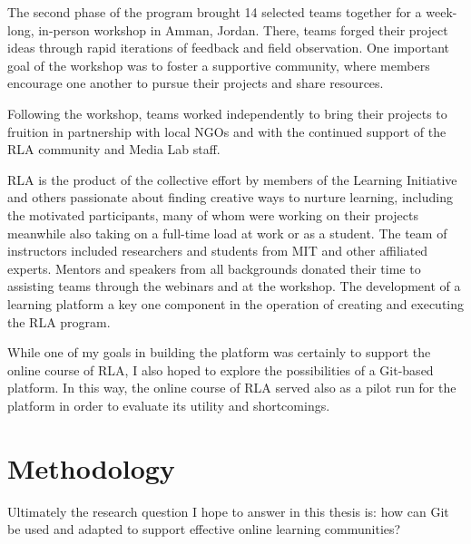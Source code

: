 \documentclass[12pt,twoside,vi]{mitthesis}
\begin{document}
The second phase of the program brought 14 selected teams together for a week-long, in-person workshop in Amman, Jordan. There, teams forged their project ideas through rapid iterations of feedback and field observation. One important goal of the workshop was to foster a supportive community, where members encourage one another to pursue their projects and share resources.

Following the workshop, teams worked independently to bring their projects to fruition in partnership with local NGOs and with the continued support of the RLA community and Media Lab staff.~\cite{rla}

RLA is the product of the collective effort by members of the Learning Initiative and others passionate about finding creative ways to nurture learning, including the motivated participants, many of whom were working on their projects meanwhile also taking on a full-time load at work or as a student. The team of instructors included researchers and students from MIT and other affiliated experts. Mentors and speakers from all backgrounds donated their time to assisting teams through the webinars and at the workshop. The development of a learning platform a key one component in the operation of creating and executing the RLA program. 

While one of my goals in building the platform was certainly to support the online course of RLA, I also hoped to explore the possibilities of a Git-based platform. In this way, the online course of RLA served also as a pilot run for the platform in order to evaluate its utility and shortcomings. 

\section{Methodology}

Ultimately the research question I hope to answer in this thesis is: how can Git be used and adapted to support effective online learning communities?
\end{document}
